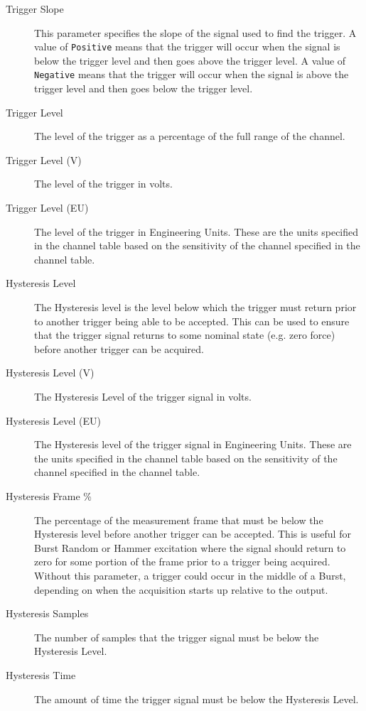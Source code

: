 \documentclass[pdf,12pt,report]{SANDreport}
\newcommand{\inlineCode}{\lstinline[basicstyle=\bfseries\ttfamily]}
\begin{document}
\begin{description}
        \item[Trigger Slope] This parameter specifies the slope of the signal used to find the trigger.  A value of \inlineCode{Positive} means that the trigger will occur when the signal is below the trigger level and then goes above the trigger level.  A value of \inlineCode{Negative} means that the trigger will occur when the signal is above the trigger level and then goes below the trigger level.
        
        \item[Trigger Level] The level of the trigger as a percentage of the full range of the channel.
        
        \item[Trigger Level (V)] The level of the trigger in volts.
        
        \item[Trigger Level (EU)] The level of the trigger in Engineering Units.  These are the units specified in the channel table based on the sensitivity of the channel specified in the channel table.
        
        \item[Hysteresis Level] The Hysteresis level is the level below which the trigger must return prior to another trigger being able to be accepted.  This can be used to ensure that the trigger signal returns to some nominal state (e.g. zero force) before another trigger can be acquired.
        
        \item[Hysteresis Level (V)] The Hysteresis Level of the trigger signal in volts.
        
        \item[Hysteresis Level (EU)] The Hysteresis level of the trigger signal in Engineering Units.  These are the units specified in the channel table based on the sensitivity of the channel specified in the channel table.
        
        \item[Hysteresis Frame \%] The percentage of the measurement frame that must be below the Hysteresis level before another trigger can be accepted.  This is useful for Burst Random or Hammer excitation where the signal should return to zero for some portion of the frame prior to a trigger being acquired.  Without this parameter, a trigger could occur in the middle of a Burst, depending on when the acquisition starts up relative to the output.
        
        \item[Hysteresis Samples] The number of samples that the trigger signal must be below the Hysteresis Level.
        
        \item[Hysteresis Time] The amount of time the trigger signal must be below the Hysteresis Level.
    \end{description}
    
\end{document}
